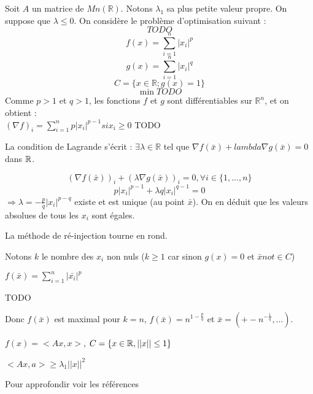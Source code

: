 \begin{ex}
	Soit $A$ un matrice de $Mn(\mathbb{R})$. Notons $\lambda _1$ sa plus petite valeur propre. On suppose que $\lambda \leq 0$. On considère le problème d'optimisation suivant : \[ TODO \]
	\[ f(x) = \sum_{i=1}^n |x_i|^p \]
	\[ g(x) = \sum_{i=1}^n |x_i|^q \]
	\[ C = \{ x \in \mathbb{R} ; g(x) = 1 \} \]
	\[ \min TODO \]
	Comme $p>1$ et $q>1$, les fonctions $f$ et $g$ sont différentiables sur $\mathbb{R}^n$, et on obtient :\\ $\displaystyle (\nabla f)_i = \sum_{i=1}^n p |x_i|^{p-1} si x_i\geq 0$ TODO
	
	La condition de Lagrande s'écrit : $\exists \lambda \in \mathbb{R}$ tel que $ \nabla f(\bar{x}) + lambda \nabla g(\bar{x}) = 0 $ dans $\mathbb{R}$.
	
	\[ (\nabla f(\bar{x}))_i + (\lambda \nabla g(\bar{x}))_i = 0 , \forall i \in \{ 1, \dots, n \} \]
	\[ p|x_i|^{p-1} + \lambda q|x_i|^{q-1} = 0 \]
	$ \Rightarrow \lambda = - \frac{p}{q}|x_i|^{p-q} $ existe et est unique (au point $\bar{x}$). On en déduit que les valeurs absolues de tous les $x_i$ sont égales.
	
	La méthode de ré-injection tourne en rond.
	
	Notons $k$ le nombre des $x_i$ non nuls ($k \geq 1$ car sinon $g(x) = 0$ et $\bar{x} not \in C$)
	
	$f(\bar{x}) = \sum_{i=1}^n |\bar{x_i}|^p$
	
	TODO
	
	Donc $f(\bar{x})$ est maximal pour $k=n$, $f(\bar{x}) = n^{1-\frac{p}{q}}$ et $\bar{x} = (+- n^{-\frac{1}{q}}, \dots)$.
	
\end{ex}

\begin{ex}
	$f(x) = <Ax, x>$, $C = \{ x\in \mathbb{R}, ||x|| \leq 1 \}$
	
	$<Ax, a> \geq \lambda _1 ||x||^2$
	
\end{ex}

	

Pour approfondir voir les références \cite{minoux} \cite{bierlaine} \cite{luenberger}
 




%
%
